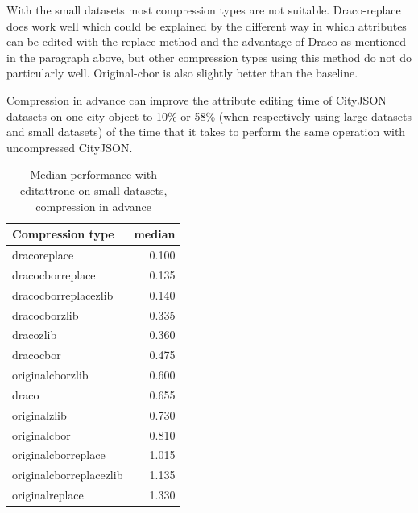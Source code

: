 With the small datasets most compression types are not suitable.
Draco-replace does work well which could be explained by the different way in which attributes can be edited with the replace method and the advantage of Draco as mentioned in the paragraph above, but other compression types using this method do not do particularly well. 
Original-cbor is also slightly better than the baseline.

Compression in advance can improve the attribute editing time of CityJSON datasets on one city object to 10\% or 58\% (when respectively using large datasets and small datasets) of the time that it takes to perform the same operation with uncompressed CityJSON.


  \begin{table}[!h]
    \begin{minipage}{.5\linewidth}
      \caption{
Median performance with editattrone on large datasets, compression in advance}
\centering

\begin{tabular}{|l|r|}
\hline
Compression type & median\\
\hline
dracoreplace & 0.100\\
\hline
dracocborreplace & 0.135\\
\hline
dracocborreplacezlib & 0.140\\
\hline
dracocborzlib & 0.335\\
\hline
dracozlib & 0.360\\
\hline
dracocbor & 0.475\\
\hline
originalcborzlib & 0.600\\
\hline
draco & 0.655\\
\hline
originalzlib & 0.730\\
\hline
originalcbor & 0.810\\
\hline
originalcborreplace & 1.015\\
\hline
originalcborreplacezlib & 1.135\\
\hline
originalreplace & 1.330\\
\hline
\end{tabular}
\end{minipage}%
    \begin{minipage}{.5\linewidth}
      \centering
        \caption{
Median performance with editattrone on small datasets, compression in advance}


\end{minipage}
\end{table}
